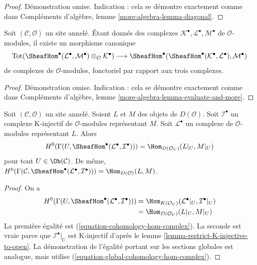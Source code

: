 \begin{proof}
Démonstration omise. Indication : cela se démontre exactement comme dans
Compléments d'algèbre, lemme \ref{more-algebra-lemma-diagonal}.
\end{proof}

\begin{lemma}
\label{lemma-evaluate-and-more}
Soit $(\mathcal{C}, \mathcal{O})$ un site annelé. Étant donnés des complexes
$\mathcal{K}^\bullet, \mathcal{L}^\bullet, \mathcal{M}^\bullet$
de $\mathcal{O}$-modules, il existe un morphisme canonique
$$
\text{Tot}(\SheafHom^\bullet(\mathcal{L}^\bullet,
\mathcal{M}^\bullet) \otimes_\mathcal{O} \mathcal{K}^\bullet)
\longrightarrow
\SheafHom^\bullet(\SheafHom^\bullet(\mathcal{K}^\bullet,
\mathcal{L}^\bullet), \mathcal{M}^\bullet)
$$
de complexes de $\mathcal{O}$-modules, fonctoriel par rapport aux trois complexes.
\end{lemma}

\begin{proof}
Démonstration omise. Indication : cela se démontre exactement comme dans
Compléments d'algèbre, lemme \ref{more-algebra-lemma-evaluate-and-more}.
\end{proof}

\begin{lemma}
\label{lemma-RHom-into-K-injective}
Soit $(\mathcal{C}, \mathcal{O})$ un site annelé. Soient $L$ et $M$
des objets de $D(\mathcal{O})$. Soit $\mathcal{I}^\bullet$
un complexe K-injectif de $\mathcal{O}$-modules représentant $M$. Soit
$\mathcal{L}^\bullet$ un complexe de $\mathcal{O}$-modules
représentant $L$.
Alors
$$
H^0(\Gamma(U, \SheafHom^\bullet(\mathcal{L}^\bullet, \mathcal{I}^\bullet))) =
\Hom_{D(\mathcal{O}_U)}(L|_U, M|_U)
$$
pour tout $U \in \Ob(\mathcal{C})$. De même,
$H^0(\Gamma(\mathcal{C},
\SheafHom^\bullet(\mathcal{L}^\bullet, \mathcal{I}^\bullet))) =
\Hom_{D(\mathcal{O})}(L, M)$.
\end{lemma}

\begin{proof}
On a
\begin{align*}
H^0(\Gamma(U, \SheafHom^\bullet(\mathcal{L}^\bullet, \mathcal{I}^\bullet)))
& =
\Hom_{K(\mathcal{O}_U)}(\mathcal{L}^\bullet|_U, \mathcal{I}^\bullet|_U) \\
& =
\Hom_{D(\mathcal{O}_U)}(L|_U, M|_U)
\end{align*}
La première égalité est (\ref{equation-cohomology-hom-complex}).
La seconde est vraie parce que $\mathcal{I}^\bullet|_U$
est K-injectif d'après le lemme \ref{lemma-restrict-K-injective-to-open}.
La démonstration de l'égalité portant sur les sections globales est analogue, mais utilise
(\ref{equation-global-cohomology-hom-complex}).
\end{proof}

